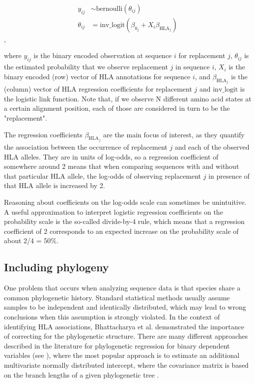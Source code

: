 \documentclass[fleqn,11pt]{SelfArx} %
\begin{document}
\begin{align}
  y_{ij} & \sim \text{bernoulli}(\theta_{ij}) \\
  \theta_{ij} & = \text{inv\_logit}(\beta_{0_{j}} + X_{i}\beta_{\text{HLA}_{j}})
\end{align}, 

where \(y_{ij}\) is the binary encoded observation at sequence \(i\) for replacement \(j\), \(\theta_{ij}\) is the estimated probability that we observe replacement \(j\) in sequence \(i\), \(X_{i}\) is the binary encoded (row) vector of HLA annotations for sequence \(i\), and \(\beta_{\text{HLA}_{j}}\) is the (column) vector of HLA regression coefficients for replacement \(j\) and  \(\text{inv\_logit}\) is the logistic link function. Note that, if we observe N different amino acid states at a certain alignment position, each of those are considered in turn to be the "replacement".

The regression coefficients \(\beta_{\text{HLA}_{j}}\) are the main focus of interest, as they quantify the association between the occurrence of replacement \(j\) and each of the observed HLA alleles. They are in units of log-odds, so a regression coefficient of somewhere around 2 means that when comparing sequences with and without that particular HLA allele, the log-odds of observing replacement \(j\) in presence of that HLA allele is increased by 2.

Reasoning about coefficients on the log-odds scale can sometimes be unintuitive. A useful approximation to interpret logistic regression coefficients on the probability scale is the so-called divide-by-4 rule, which means that a regression coefficient of 2 corresponds to an expected increase on the probability scale of about 2/4 = 50\%. 

\subsection*{Including phylogeny}

One problem that occurs when analyzing sequence data is that species share a common phylogenetic history. Standard statistical methods usually assume samples to be independent and identically distributed, which may lead to wrong conclusions when this assumption is strongly violated.
In the context of identifying HLA associations, Bhattacharya et al. demonstrated the importance of correcting for the phylogenetic structure.
There are many different approaches described in the literature for phylogenetic regression for binary dependent variables (see \cite{Ives2014}), where the most popular approach is to estimate an additional multivariate normally distributed intercept, where the covariance matrix is based on the branch lengths of a given phylogenetic tree \cite{Ives2009}.
\end{document}
